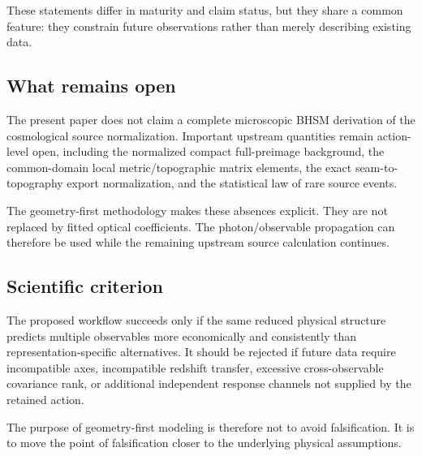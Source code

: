 These statements differ in maturity and claim status, but they share a common
feature: they constrain future observations rather than merely describing
existing data.

\subsection{What remains open}

The present paper does not claim a complete microscopic BHSM derivation of the
cosmological source normalization.  Important upstream quantities remain
action-level open, including the normalized compact full-preimage background,
the common-domain local metric/topographic matrix elements, the exact
seam-to-topography export normalization, and the statistical law of rare
source events.

The geometry-first methodology makes these absences explicit.  They are not
replaced by fitted optical coefficients.  The photon/observable propagation
can therefore be used while the remaining upstream source calculation
continues.

\subsection{Scientific criterion}

The proposed workflow succeeds only if the same reduced physical structure
predicts multiple observables more economically and consistently than
representation-specific alternatives.  It should be rejected if future data
require incompatible axes, incompatible redshift transfer, excessive
cross-observable covariance rank, or additional independent response channels
not supplied by the retained action.

The purpose of geometry-first modeling is therefore not to avoid
falsification.  It is to move the point of falsification closer to the
underlying physical assumptions.
